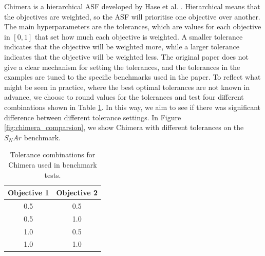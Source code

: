 Chimera is a hierarchical ASF developed by Hase et al. \cite{Hase2018b, Hase2020a}. Hierarchical means that the objectives are weighted, so the ASF will prioritise one objective over another. The main hyperparameters are the tolerances, which are values for each objective in $[0,1]$ that set how much each objective is weighted. A smaller tolerance indicates that the objective will be weighted more, while a larger tolerance indicates that the objective will be weighted less. The original paper does not give a clear mechanism for setting the tolerances, and the tolerances in the examples are tuned to the specific benchmarks used in the paper. To reflect what might be seen in practice, where the best optimal tolerances are not known in advance, we choose to round values for the tolerances and test four different combinations shown in Table \ref{tab:chimera_tolerances}. In this way, we aim to see if there was significant difference between different tolerance settings. In Figure \ref{fig:chimera_comparsion}, we show Chimera with different tolerances on the $S_NAr$ benchmark.


\begin{table}
    \centering
    \caption{Tolerance combinations for Chimera used in benchmark tests.}
    \begin{tabular}{cc}
         Objective 1 & Objective 2  \\
         \hline
         0.5 & 0.5 \\
         0.5 & 1.0 \\
         1.0 & 0.5 \\
         1.0 & 1.0 \\
    \end{tabular}
    \label{tab:chimera_tolerances}
\end{table}

